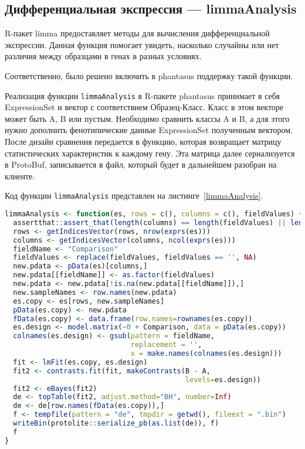 \documentclass[specification,annotation]{itmo-student-thesis}
\begin{document}
\subsection{Дифференциальная экспрессия --- limmaAnalysis}
R-пакет limma \cite{limma} предоставляет методы для вычисления дифференциальной экспрессии. Данная функция помогает увидеть, насколько случайны или нет различия между образцами в генах в разных условиях.

Соответственно, было решено включить в phantasus поддержку такой функции.

Реализация функции \texttt{limmaAnalysis} в R-пакете phantasus принимает в себя ExpressionSet и вектор с соответствием Образец-Класс. Класс в этом векторе может быть A, B или пустым. Необходимо сравнить классы A и B, а для этого нужно дополнить фенотипические данные ExpressionSet полученным вектором.
После дизайн сравнения передается в функцию, которая возвращает матрицу статистических характеристик к каждому гену.
Эта матрица далее сериализуется в ProtoBuf, записывается в файл, который будет в дальнейшем разобран на клиенте.

Код функции \texttt{limmaAnalysis} представлен на листинге~\ref{limmaAnalysis}.

\begin{lstlisting}[float=!h,caption={Реализация дифференциальной экспрессии в R-пакете phantasus},label={limmaAnalysis},language=R]
limmaAnalysis <- function(es, rows = c(), columns = c(), fieldValues) {
  assertthat::assert_that(length(columns) == length(fieldValues) || length(columns) == 0)
  rows <- getIndicesVector(rows, nrow(exprs(es)))
  columns <- getIndicesVector(columns, ncol(exprs(es)))
  fieldName <- "Comparison"
  fieldValues <- replace(fieldValues, fieldValues == '', NA)
  new.pdata <- pData(es)[columns,]
  new.pdata[[fieldName]] <- as.factor(fieldValues)
  new.pdata <- new.pdata[!is.na(new.pdata[[fieldName]]),]
  new.sampleNames <- row.names(new.pdata)
  es.copy <- es[rows, new.sampleNames]
  pData(es.copy) <- new.pdata
  fData(es.copy) <- data.frame(row.names=rownames(es.copy))
  es.design <- model.matrix(~0 + Comparison, data = pData(es.copy))
  colnames(es.design) <- gsub(pattern = fieldName,
                              replacement = '',
                              x = make.names(colnames(es.design)))
  fit <- lmFit(es.copy, es.design)
  fit2 <- contrasts.fit(fit, makeContrasts(B - A,
                                           levels=es.design))
  fit2 <- eBayes(fit2)
  de <- topTable(fit2, adjust.method="BH", number=Inf)
  de <- de[row.names(fData(es.copy)),]
  f <- tempfile(pattern = "de", tmpdir = getwd(), fileext = ".bin")
  writeBin(protolite::serialize_pb(as.list(de)), f)
  f
}
\end{lstlisting}
\end{document}
